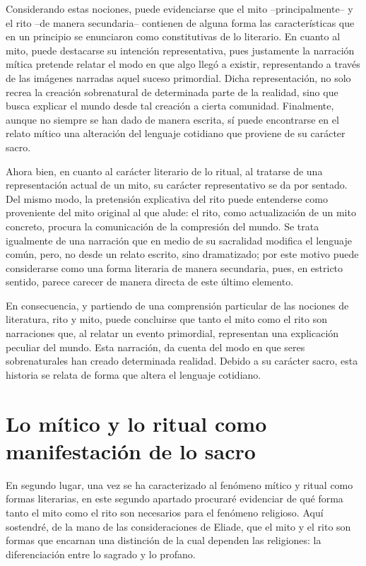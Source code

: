 \begin{refsection}
Considerando estas nociones, puede evidenciarse que el mito --principalmente-- y el rito --de manera secundaria-- contienen de alguna forma las características que en un principio se enunciaron como constitutivas de lo literario. En cuanto al mito, puede destacarse su intención representativa, pues justamente la narración mítica pretende relatar el modo en que algo llegó a existir, representando a través de las imágenes narradas aquel suceso primordial. Dicha representación, no solo recrea la creación sobrenatural de determinada parte de la realidad, sino que busca explicar el mundo desde tal creación a cierta comunidad. Finalmente, aunque no siempre se han dado de manera escrita, sí puede encontrarse en el relato mítico una alteración del lenguaje cotidiano que proviene de su carácter sacro.

Ahora bien, en cuanto al carácter literario de lo ritual, al tratarse de una representación actual de un mito, su carácter representativo se da por sentado. Del mismo modo, la pretensión explicativa del rito puede entenderse como proveniente del mito original al que alude: el rito, como actualización de un mito concreto, procura la comunicación de la compresión del mundo. Se trata igualmente de una narración que en medio de su sacralidad modifica el lenguaje común, pero, no desde un relato escrito, sino dramatizado; por este motivo puede considerarse como una forma literaria de manera secundaria, pues, en estricto sentido, parece carecer de manera directa de este último elemento.

En consecuencia, y partiendo de una comprensión particular de las nociones de literatura, rito y mito, puede concluirse que tanto el mito como el rito son narraciones que, al relatar un evento primordial, representan una explicación peculiar del mundo. Esta narración, da cuenta del modo en que seres sobrenaturales han creado determinada realidad. Debido a su carácter sacro, esta historia se relata de forma que altera el lenguaje cotidiano.

\section{Lo mítico y lo ritual como manifestación de lo sacro }

En segundo lugar, una vez se ha caracterizado al fenómeno mítico y ritual como formas literarias, en este segundo apartado procuraré evidenciar de qué forma tanto el mito como el rito son necesarios para el fenómeno religioso. Aquí sostendré, de la mano de las consideraciones de Eliade, que el mito y el rito son formas que encarnan una distinción de la cual dependen las religiones: la diferenciación entre lo sagrado y lo profano.


\end{refsection}
